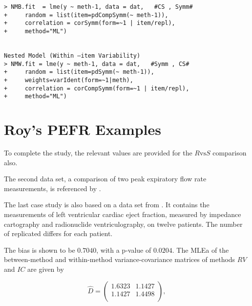 \begin{framed}\begin{verbatim}
> NMB.fit  = lme(y ~ meth-1, data = dat,   #CS , Symm#
+     random = list(item=pdCompSymm(~ meth-1)),
+     correlation = corSymm(form=~1 | item/repl), 
+     method="ML")


Nested Model (Within –item Variability)
> NMW.fit = lme(y ~ meth-1, data = dat,   #Symm , CS# 
+     random = list(item=pdSymm(~ meth-1)),
+     weights=varIdent(form=~1|meth), 
+     correlation = corCompSymm(form=~1 | item/repl), 
+     method="ML")
\end{verbatim}
\end{framed}


\section{Roy's PEFR Examples}



To complete the study, the relevant values are provided for the $R \mbox{vs} S$ comparison also.


The second data set, a comparison of two peak expiratory flow rate measurements, is referenced by \citet{BA86}.


The last case study is also based on a data set from  \citet{BA99}. It contains the measurements of left ventricular cardiac eject fraction, measured by impedance cartography and radionuclide ventriculography, on twelve patients.
The number of replicated differs for each patient.

The bias is shown to be $0.7040$, with a p-value of $0.0204$. The MLEa of the between-method and within-method variance-covariance matrices of methods $RV$ and $IC$ are given by

\begin{equation}\hat{D}=\left(
\begin{array}{cc}
1.6323 & 1.1427 \\
1.1427 & 1.4498 \\
\end{array}
\right),
\end{equation}



